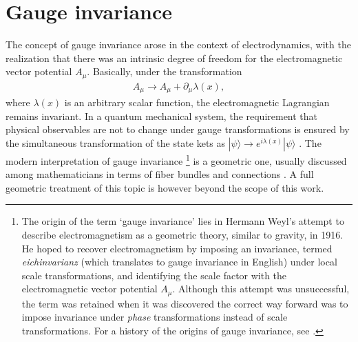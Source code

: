 \section{Gauge invariance}\label{sec:gauge_invariance}

The concept of gauge invariance arose in the context of electrodynamics, with the realization that there was an intrinsic degree of freedom for the electromagnetic vector potential $A_\mu$. Basically, under the transformation 
\begin{align}
  A_\mu\rightarrow A_\mu + \partial_\mu \lambda(x),
  \label{eq:gauge_transformation}
\end{align}
where $\lambda(x)$ is an arbitrary scalar function, the electromagnetic Lagrangian remains invariant. In a quantum mechanical system, the requirement that physical observables are not to change under gauge transformations is ensured by the simultaneous transformation of the state kets as $|\psi\rangle\rightarrow e^{i\lambda(x)}|\psi\rangle$ \citep{Sakurai2010}. The modern interpretation of gauge invariance%
\footnote{The origin of the term `gauge invariance' lies in Hermann Weyl's attempt to describe electromagnetism as a geometric theory, similar to gravity, in 1916. He hoped to recover electromagnetism by imposing an invariance, termed \emph{eichinvarianz} (which translates to gauge invariance in English)  under local scale transformations, and identifying the scale factor with the electromagnetic vector potential $A_\mu$. Although this attempt was unsuccessful, the term was retained when it was discovered the correct way forward was to impose invariance under \emph{phase} transformations instead of scale transformations. For a history of the origins of gauge invariance, see \citep{Jackson2001}.}%
 is a geometric one, usually discussed among mathematicians in terms of fiber bundles and connections \citep{Cheng1985}. A full geometric treatment of this topic is however beyond the scope of this work.

